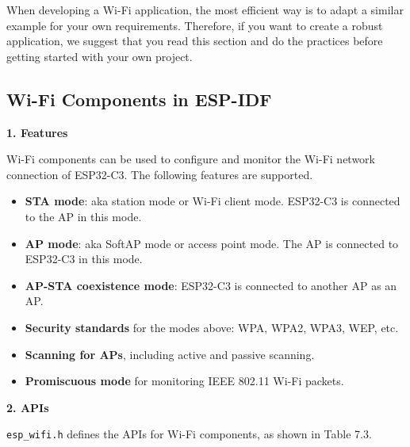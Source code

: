 \documentclass[a4paper,12pt,openany]{book}
\begin{document}
When developing a Wi-Fi application, the most efficient way is to adapt a similar example for your own requirements. Therefore, if you want to create a robust application, we suggest that you read this section and do the practices before getting started with your own project.

\subsection{Wi-Fi Components in ESP-IDF}
\textbf{1. Features}

Wi-Fi components can be used to configure and monitor the Wi-Fi network connection of ESP32-C3. The following features are supported.

\begin{itemize}[noitemsep]
    \item \textbf{STA mode}: aka station mode or Wi-Fi client mode. ESP32-C3 is connected to the AP in this mode.
    \item \textbf{AP mode}: aka SoftAP mode or access point mode. The AP is connected to ESP32-C3 in this mode.
    \item \textbf{AP-STA coexistence mode}: ESP32-C3 is connected to another AP as an AP.
    \item \textbf{Security standards} for the modes above: WPA, WPA2, WPA3, WEP, etc.
    \item \textbf{Scanning for APs}, including active and passive scanning.
    \item \textbf{Promiscuous mode} for monitoring IEEE 802.11 Wi-Fi packets.
\end{itemize}

\textbf{2. APIs}

\verb|esp_wifi.h| defines the APIs for Wi-Fi components, as shown in Table 7.3.
\end{document}
